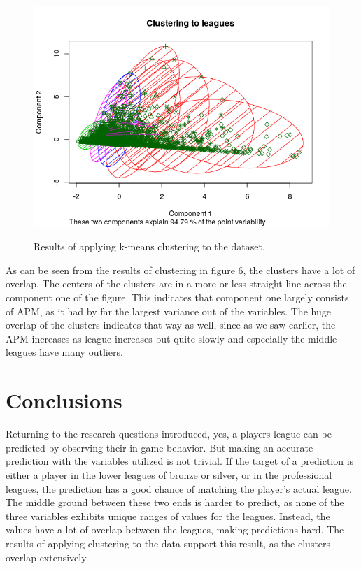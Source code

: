 \documentclass{article}
\begin{document}
\begin{figure} [H]
    \centering
    \includegraphics[width=\textwidth]{clustering.png}
    \label{figure:clustering}
    \caption{Results of applying k-means clustering to the dataset.}
\end{figure}

As can be seen from the results of clustering in figure 6, the clusters have a lot of overlap. The centers of the clusters are in a more or less straight line across the component one of the figure. This indicates that component one largely consists of APM, as it had by far the largest variance out of the variables. The huge overlap of the clusters indicates that way as well, since as we saw earlier, the APM increases as league increases but quite slowly and especially the middle leagues have many outliers.

\section{Conclusions}
Returning to the research questions introduced, yes, a players league can be predicted by observing their in-game behavior. But making an accurate prediction with the variables utilized is not trivial. If the target of a prediction is either a player in the lower leagues of bronze or silver, or in the professional leagues, the prediction has a good chance of matching the player's actual league. The middle ground between these two ends is harder to predict, as none of the three variables exhibits unique ranges of values for the leagues. Instead, the values have a lot of overlap between the leagues, making predictions hard. The results of applying clustering to the data support this result, as the clusters overlap extensively.
\end{document}
